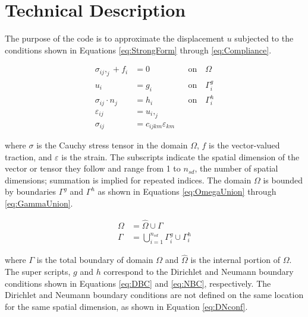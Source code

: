 \documentclass[a4paper, 12pt]{article}
\begin{document}
\section{Technical Description} \label{sec:techDes}
The purpose of the code is to approximate the displacement
$u$ subjected to the conditions shown in Equations
\ref{eq:StrongForm} through \ref{eq:Compliance}.

\begin{align}
\sigma_{ij},_{j} + f_i &= 0  &  &\text{on} \quad  \Omega
  \label{eq:StrongForm}                                          \\
u_i &= g_i                   &  &\text{on} \quad \Gamma^{g}_{i}
  \label{eq:DBC}                                                 \\
\sigma_{ij} \cdot n_j &= h_i &  &\text{on} \quad \Gamma^{h}_{i}
  \label{eq:NBC}                                                 \\
\varepsilon_{ij} &= u_{i},_{j}&  &\quad
  \label{eq:strainDef}                                           \\
\sigma_{ij} &= c_{ijkm} \varepsilon_{km} & &\quad
  \label{eq:Compliance}
\end{align}

\noindent
where $\sigma$ is the Cauchy stress tensor in
the domain $\Omega$, $f$ is the
vector-valued traction, and $\varepsilon$ is the strain.
The subscripts indicate the spatial dimension of the vector or
tensor they follow and range from 1 to $n_{sd}$, the number
of spatial dimensions; summation is implied for repeated
indices.  The domain $\Omega$ is bounded by boundaries
$\Gamma^{g}$ and $\Gamma^{h}$ as shown
in Equations \ref{eq:OmegaUnion} through \ref{eq:GammaUnion}.

\begin{align}
\Omega &= \hat{\Omega} \cup \Gamma
  \label{eq:OmegaUnion}               \\
\Gamma &= \bigcup_{i=1}^{n_{sd}} \Gamma^{g}_{i} \cup \Gamma^{h}_{i}
  \label{eq:GammaUnion}
\end{align}

\noindent
where $\Gamma$ is the total boundary of domain $\Omega$
and $\hat{\Omega}$ is the internal portion of $\Omega$.
The super scripts, $g$ and $h$ correspond
to the Dirichlet and Neumann boundary conditions shown in Equations
\ref{eq:DBC} and \ref{eq:NBC}, respectively. The Dirichlet and
Neumann boundary conditions are not defined on the same location
for the same spatial dimension, as shown in Equation \ref{eq:DNconf}.
\end{document}
